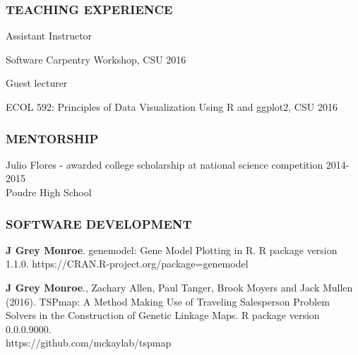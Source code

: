 \documentclass[12pt,english]{article}
\begin{document}

\subsubsection*{TEACHING EXPERIENCE}
\vspace{-0.5ex}\par

\hspace*{1.0em} Assistant Instructor
\par
\hspace*{2.0em} Software Carpentry Workshop, CSU
\hfill 
2016
\par
\vspace{0.5em}
\hspace*{1.0em} Guest lecturer
\par
\hspace*{2.0em} ECOL 592: Principles of Data Visualization Using R and ggplot2, CSU
\hfill 
2016
\vspace{0.5em}\par


\subsubsection*{MENTORSHIP}
\vspace{-0.5ex}\par

\hspace*{1.0em} Julio Flores - awarded college scholarship at national science competition 
\hfill 
2014-2015\\
\hspace*{2.0em} Poudre High School


\subsubsection*{SOFTWARE DEVELOPMENT}
\vspace{-0.5ex}

\begin{hangparas}{.5in}{1}

\hspace{1em}\textbf{J Grey Monroe}. genemodel: Gene Model Plotting in R. R package version 1.1.0.
  https://CRAN.R-project.org/package=genemodel
\vspace{0.5ex}\par
\hspace{1em}\textbf{J Grey Monroe}., Zachary Allen, Paul Tanger, Brook Moyers and Jack Mullen (2016). TSPmap: A Method Making Use of Traveling Salesperson Problem Solvers in the Construction of Genetic Linkage Maps. R package version 0.0.0.9000. \\https://github.com/mckaylab/tspmap

\end{hangparas}
\end{document}
